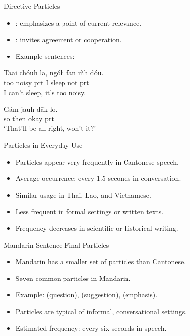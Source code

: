 \documentclass{beamer}
\newcommand{\cmn}{\mtciteform}
\begin{document}
\begin{frame}{Directive Particles}
  \begin{itemize}
    \item \cmn{la}: emphasizes a point of current relevance.
    \item \cmn{lo}: invites agreement or cooperation.
    \item Example sentences:
  \end{itemize}
  \begin{example}
    \gll Taai chóuh la, ngóh fan m̀h dóu. \\
         too noisy prt I sleep not prt \\
    \trans I can't sleep, it's too noisy.
  \end{example}
  \begin{example}
    \gll Gám jauh dāk lo. \\
         so then okay prt \\
    \trans ‘That'll be all right, won't it?’
  \end{example}
\end{frame}

\begin{frame}{Particles in Everyday Use}
  \begin{itemize}
    \item Particles appear very frequently in Cantonese speech.
    \item Average occurrence: every 1.5 seconds in conversation.
    \item Similar usage in Thai, Lao, and Vietnamese.
    \item Less frequent in formal settings or written texts.
    \item Frequency decreases in scientific or historical writing.
  \end{itemize}
\end{frame}

\begin{frame}{Mandarin Sentence-Final Particles}
  \begin{itemize}
    \item Mandarin has a smaller set of particles than Cantonese.
    \item Seven common particles in Mandarin.
    \item Example: \cmn{ma} (question), \cmn{ba} (suggestion), \cmn{ne} (emphasis).
    \item Particles are typical of informal, conversational settings.
    \item Estimated frequency: every six seconds in speech.
  \end{itemize}
\end{frame}
\end{document}
